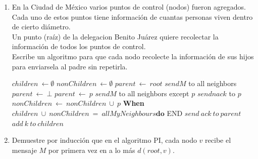 \documentclass[12pt,a4paper]{report}
\begin{document}
\begin{enumerate}
		\item {
			En la Ciudad de México varios puntos de control (nodos) fueron agregados.\\
			Cada uno de estos puntos tiene información de cuantas personas viven
			dentro de cierto diámetro. \\
			Un punto (raíz) de la delegacion Benito Juárez quiere recolectar la
			información de todos los puntos de control. \\
			Escribe un algoritmo para que cada nodo recolecte la información de sus
			hijos para enviarsela al padre sin repetirla.\\

			\begin{algorithmic}[1]
				\State $children \ \leftarrow \emptyset$
				\State $nonChildren \ \leftarrow \emptyset$
					\State $parent\ \leftarrow\ root$
					\State $send M$ to all neighbors
				\Else
					\State $parent\ \leftarrow\ \bot$
				\EndIf
				\State {}
				\Start
						\State $parent\ \leftarrow\ p$
						\State $send M$ to all neighbors except $p$
					\Else
						\State $send nack$ to $p$
					\EndIf
				\End
				\State {}
				\Start
					\State $nonChildren\ \leftarrow\ nonChildren\ \cup\ {p}$
				\End
				\textbf{When} $children\ \cup\ nonChildren\ =\ allMyNeighbours
							\textbf{do}$
				\Start
						\State END
					\Else
						\State $send\ ack\ to\ parent$
					\EndIf
				\Start
					\State $add\ k\ to\ children$
				\End
				\End
			\end{algorithmic}
			}

		\item{
			Demuestre por inducción que en el algoritmo PI, cada nodo $v$ recibe el
			mensaje $M$ por primera vez en a lo más $d(root, v)$.\\

}
\end{enumerate}
\end{document}
